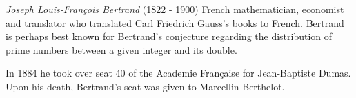 \documentclass[12pt]{article}
\begin{document}
\emph{Joseph Louis-Fran\c{c}ois Bertrand} (1822 - 1900) French mathematician, economist and translator who translated Carl Friedrich Gauss's books to French. Bertrand is perhaps best known for Bertrand's conjecture regarding the distribution of prime numbers between a given integer and its double.

In 1884 he took over seat 40 of the Academie Fran\c{c}aise for Jean-Baptiste Dumas. Upon his death, Bertrand's seat was given to Marcellin Berthelot.
\end{document}
